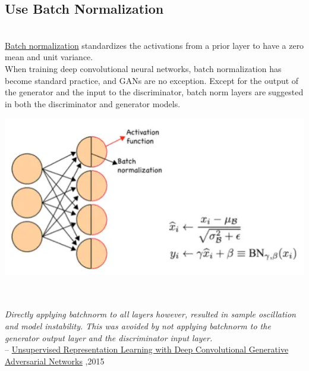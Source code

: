 \documentclass[14pt]{article}
\begin{document}
\subsection{Use Batch Normalization}
\\
\hyperlink{https://machinelearningmastery.com/how-to-accelerate-learning-of-deep-neural-networks-with-batch-normalization/}{Batch normalization} standardizes the activations from a prior layer to have a zero mean and unit variance. \\
When training deep convolutional neural networks, batch normalization has become standard practice, and GANs are no exception. Except for the output of the generator and the input to the discriminator, batch norm layers are suggested in both the discriminator and generator models.
\\ 
\begin{center}
    \includegraphics[width = 12 cm ]{batch.png}
\end{center} \\ \\ 
\hspace*{1cm} \textit{Directly applying batchnorm to all layers however, resulted in sample oscillation and model instability. This was avoided by not applying batchnorm to the generator output layer and the discriminator input layer.}\\
\hspace*{4cm} --
\hyperlink{https://arxiv.org/abs/1511.06434}{Unsupervised Representation Learning with Deep Convolutional Generative Adversarial Networks} ,2015
\\
\end{document}
